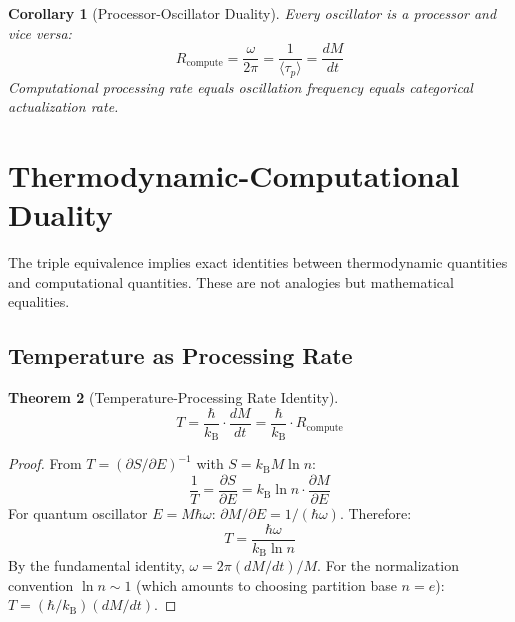 \documentclass[11pt,a4paper]{article}
\newtheorem{theorem}{Theorem}[section]
\newtheorem{corollary}[theorem]{Corollary}
\theoremstyle{definition}
\theoremstyle{remark}
\newcommand{\kB}{k_{\mathrm{B}}}
\newcommand{\taup}{\tau_p}
\begin{document}
\begin{corollary}[Processor-Oscillator Duality]
\label{cor:processor}
Every oscillator is a processor and vice versa:
\begin{equation}
R_{\mathrm{compute}} = \frac{\omega}{2\pi} = \frac{1}{\langle \taup \rangle} = \frac{dM}{dt}
\end{equation}
Computational processing rate equals oscillation frequency equals categorical actualization rate.
\end{corollary}

\section{Thermodynamic-Computational Duality}
\label{sec:thermo_comp}

The triple equivalence implies exact identities between thermodynamic quantities and computational quantities. These are not analogies but mathematical equalities.

\subsection{Temperature as Processing Rate}

\begin{theorem}[Temperature-Processing Rate Identity]
\label{thm:temperature}
\begin{equation}
T = \frac{\hbar}{\kB} \cdot \frac{dM}{dt} = \frac{\hbar}{\kB} \cdot R_{\mathrm{compute}}
\label{eq:temp_rate}
\end{equation}
\end{theorem}

\begin{proof}
From $T = (\partial S / \partial E)^{-1}$ with $S = \kB M \ln n$:
\begin{equation}
\frac{1}{T} = \frac{\partial S}{\partial E} = \kB \ln n \cdot \frac{\partial M}{\partial E}
\end{equation}
For quantum oscillator $E = M \hbar \omega$: $\partial M / \partial E = 1/(\hbar \omega)$. Therefore:
\begin{equation}
T = \frac{\hbar \omega}{\kB \ln n}
\end{equation}
By the fundamental identity, $\omega = 2\pi (dM/dt)/M$. For the normalization convention $\ln n \sim 1$ (which amounts to choosing partition base $n = e$): $T = (\hbar/\kB)(dM/dt)$.
\end{proof}
\end{document}
